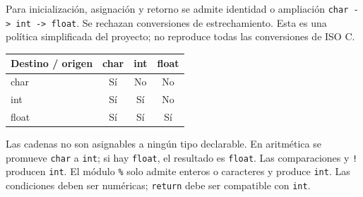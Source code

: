 Para inicialización, asignación y retorno se admite identidad o ampliación \texttt{char -> int -> float}. Se rechazan conversiones de estrechamiento. Esta es una política simplificada del proyecto; no reproduce todas las conversiones de ISO C.

\begin{tabular}{@{}lccc@{}}\toprule Destino / origen & char & int & float\\\midrule
char & Sí & No & No\\
int & Sí & Sí & No\\
float & Sí & Sí & Sí\\\bottomrule\end{tabular}

Las cadenas no son asignables a ningún tipo declarable. En aritmética se promueve \texttt{char} a \texttt{int}; si hay \texttt{float}, el resultado es \texttt{float}. Las comparaciones y \texttt{!} producen \texttt{int}. El módulo \texttt{\%} solo admite enteros o caracteres y produce \texttt{int}. Las condiciones deben ser numéricas; \texttt{return} debe ser compatible con \texttt{int}.
